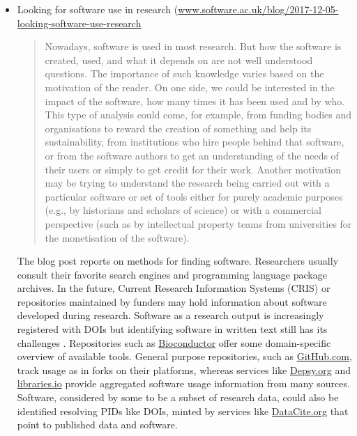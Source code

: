 \documentclass[11pt,letterpaper]{article}
\begin{document}
\begin{itemize}
\item Looking for software use in research (\href{https://www.software.ac.uk/blog/2017-12-05-looking-software-use-research}
{www.software.ac.uk/blog/2017-12-05-looking-software-use-research}
\begin{quote}
Nowadays, software is used in most research. But how the software is created, used, and what it depends on are not well understood questions. The importance of such knowledge varies based on the motivation of the reader. On one side, we could be interested in the impact of the software, how many times it has been used and by who. This type of analysis could come, for example, from funding bodies and organisations to reward the creation of something and help its sustainability, from institutions who hire people behind that software, or from the software authors to get an understanding of the needs of their users or simply to get credit for their work. Another motivation may be trying to understand the research being carried out with a particular software or set of tools either for purely academic purposes (e.g., by historians and scholars of science) or with a commercial perspective (such as by intellectual property teams from universities for the monetisation of the software). %
\end{quote}
The blog post reports on methods for finding software. Researchers usually consult their favorite search engines and programming language package archives. In the future, Current Research Information Systems (CRIS) or repositories maintained by funders may hold information about software developed during research. Software as a research output is increasingly registered with DOIs \cite{Fenner2018DOI} but identifying software in written text still has its challenges \cite{Li2017R}. Repositories such as \href{https://www.bioconductor.org/}{Bioconductor} offer some domain-specific overview of available tools. General purpose repositories, such as \href{http://github.com}{GitHub.com}, track usage as in forks on their platforms, whereas services like \href{http://dpesy.org}{Depsy.org} and \href{https://libraries.io/}{libraries.io} provide aggregated software usage information from many sources. %
Software, considered by some to be a subset of research data, could also be identified resolving PIDs like DOIs, minted by services like \href{http://datacite.org}{DataCite.org} that point to published data and software. 

\end{itemize}
\end{document}
